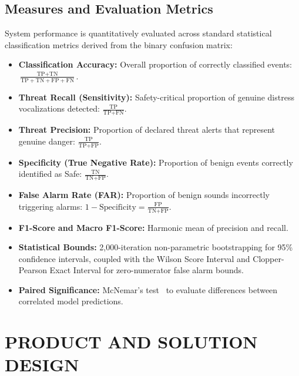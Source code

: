 \documentclass[12pt, a4paper]{report}
\begin{document}
\section{Measures and Evaluation Metrics}
System performance is quantitatively evaluated across standard statistical classification metrics derived from the binary confusion matrix:
\begin{itemize}
    \item \textbf{Classification Accuracy:} Overall proportion of correctly classified events: $\frac{\text{TP} + \text{TN}}{\text{TP} + \text{TN} + \text{FP} + \text{FN}}$.
    \item \textbf{Threat Recall (Sensitivity):} Safety-critical proportion of genuine distress vocalizations detected: $\frac{\text{TP}}{\text{TP} + \text{FN}}$.
    \item \textbf{Threat Precision:} Proportion of declared threat alerts that represent genuine danger: $\frac{\text{TP}}{\text{TP} + \text{FP}}$.
    \item \textbf{Specificity (True Negative Rate):} Proportion of benign events correctly identified as Safe: $\frac{\text{TN}}{\text{TN} + \text{FP}}$.
    \item \textbf{False Alarm Rate (FAR):} Proportion of benign sounds incorrectly triggering alarms: $1 - \text{Specificity} = \frac{\text{FP}}{\text{TN} + \text{FP}}$.
    \item \textbf{F1-Score and Macro F1-Score:} Harmonic mean of precision and recall.
    \item \textbf{Statistical Bounds:} 2,000-iteration non-parametric bootstrapping for 95\% confidence intervals, coupled with the Wilson Score Interval and Clopper-Pearson Exact Interval for zero-numerator false alarm bounds.
    \item \textbf{Paired Significance:} McNemar's test~\cite{ref_mcnemar1947} to evaluate differences between correlated model predictions.
\end{itemize}

\chapter{PRODUCT AND SOLUTION DESIGN}
\end{document}
